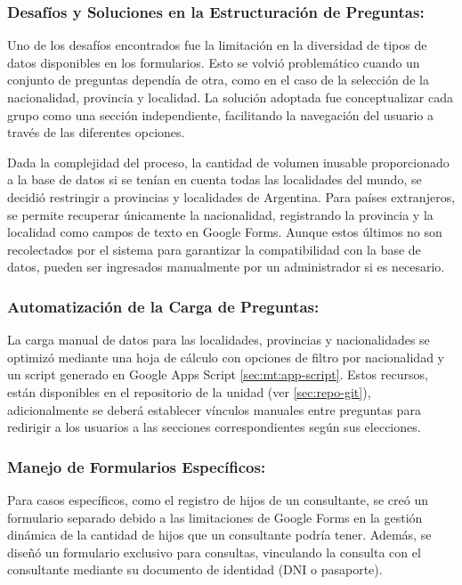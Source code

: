 \subsubsection{Desafíos y Soluciones en la Estructuración de Preguntas:}
Uno de los desafíos encontrados fue la limitación en la diversidad de tipos de datos disponibles en los formularios. Esto se volvió problemático cuando un conjunto de preguntas dependía de otra, como en el caso de la selección de la nacionalidad, provincia y localidad. La solución adoptada fue conceptualizar cada grupo como una sección independiente, facilitando la navegación del usuario a través de las diferentes opciones.

Dada la complejidad del proceso, la cantidad de volumen inusable proporcionado a la base de datos si se tenían en cuenta todas las localidades del mundo,  se decidió restringir a provincias y localidades de Argentina. Para países extranjeros, se permite recuperar únicamente la nacionalidad, registrando la provincia y la localidad como campos de texto en Google Forms. Aunque estos últimos no son recolectados por el sistema para garantizar la compatibilidad con la base de datos, pueden ser ingresados manualmente por un administrador si es necesario.

\subsubsection{Automatización de la Carga de Preguntas:}
La carga manual de datos para las localidades, provincias y nacionalidades se optimizó mediante una hoja de cálculo con opciones de filtro por nacionalidad y un script generado en Google Apps Script \ref{sec:mt:app-script}. Estos recursos, están disponibles en el repositorio de la unidad (ver \ref{sec:repo-git}), adicionalmente se deberá establecer vínculos manuales entre preguntas para redirigir a los usuarios a las secciones correspondientes según sus elecciones.

\subsubsection{Manejo de Formularios Específicos:}
Para casos específicos, como el registro de hijos de un consultante, se creó un formulario separado debido a las limitaciones de Google Forms en la gestión dinámica de la cantidad de hijos que un consultante podría tener. Además, se diseñó un formulario exclusivo para consultas, vinculando la consulta con el consultante mediante su documento de identidad (DNI o pasaporte).

